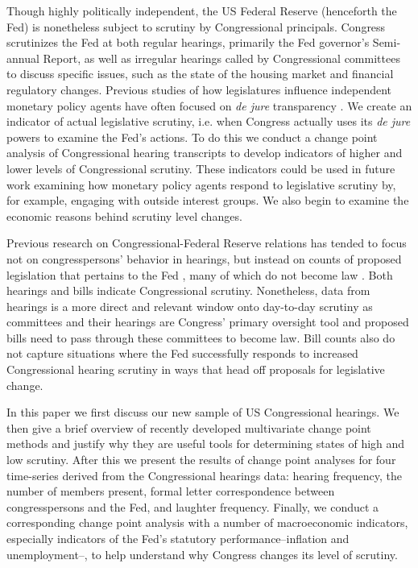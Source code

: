 \documentclass[a4paper]{article}\usepackage[]{graphicx}\usepackage[]{color}
\begin{document}
Though highly politically independent, the US Federal Reserve (henceforth the Fed) is nonetheless subject to scrutiny by Congressional principals. Congress scrutinizes the Fed at both regular hearings, primarily the Fed governor's Semi-annual Report, as well as irregular hearings called by Congressional committees to discuss specific issues, such as the state of the housing market and financial regulatory changes. Previous studies of how legislatures influence independent monetary policy agents have often focused on \emph{de jure} transparency \citep[for example][]{Stasavage2003}. We create an indicator of actual legislative scrutiny, i.e. when Congress actually uses its \emph{de jure} powers to examine the Fed's actions. To do this we conduct a change point analysis \citep{SenSrivastava1975, Killick2013, Matteson2014} of Congressional hearing transcripts to develop indicators of higher and lower levels of Congressional scrutiny. These indicators could be used in future work examining how monetary policy agents respond to legislative scrutiny by, for example, engaging with outside interest groups. We also begin to examine the economic reasons behind scrutiny level changes.

Previous research on Congressional-Federal Reserve relations has tended to focus not on congresspersons' behavior in hearings, but instead on counts of proposed legislation that pertains to the Fed \citep[e.g.][]{Kettl1988}, many of which do not become law \citep{Binder2014}. Both hearings and bills indicate Congressional scrutiny. Nonetheless, data from hearings is a more direct and relevant window onto day-to-day scrutiny as committees and their hearings are Congress' primary oversight tool \citep[][382]{oleszek2013} and proposed bills need to pass through these committees to become law. Bill counts also do not capture situations where the Fed successfully responds to increased Congressional hearing scrutiny in ways that head off proposals for legislative change.

In this paper we first discuss our new sample of US Congressional hearings. We then give a brief overview of recently developed multivariate change point methods and justify why they are useful tools for determining states of high and low scrutiny. After this we present the results of change point analyses for four time-series derived from the Congressional hearings data: hearing frequency, the number of members present, formal letter correspondence between congresspersons and the Fed, and laughter frequency. Finally, we conduct a corresponding change point analysis with a number of macroeconomic indicators, especially indicators of the Fed's statutory performance--inflation and unemployment--, to help understand why Congress changes its level of scrutiny.
\end{document}
